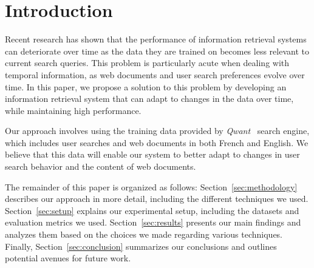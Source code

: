 \section{Introduction}
\label{sec:introduction}

Recent research has shown that the performance of information retrieval systems can deteriorate over time as the data they are trained on becomes less relevant to current search queries. 
This problem is particularly acute when dealing with temporal information, as web documents and user search preferences evolve over time. 
In this paper, we propose a solution to this problem by developing an information retrieval system that can adapt to changes in the data over time, while maintaining high performance.

Our approach involves using the training data provided by \textit{Qwant}~\cite{qwant} search engine, which includes user searches and web documents in both French and English.
We believe that this data will enable our system to better adapt to changes in user search behavior and the content of web documents.

The remainder of this paper is organized as follows: 
Section~\ref{sec:methodology} describes our approach in more detail, including the different techniques we used. 
Section~\ref{sec:setup} explains our experimental setup, including the datasets and evaluation metrics we used. 
Section~\ref{sec:results} presents our main findings and analyzes them based on the choices we made regarding various techniques. 
Finally, Section~\ref{sec:conclusion} summarizes our conclusions and outlines potential avenues for future work.